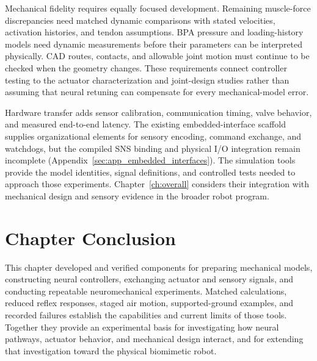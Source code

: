 Mechanical fidelity requires equally focused development. Remaining muscle-force discrepancies need matched dynamic comparisons with stated velocities, activation histories, and tendon assumptions. BPA pressure and loading-history models need dynamic measurements before their parameters can be interpreted physically. CAD routes, contacts, and allowable joint motion must continue to be checked when the geometry changes. These requirements connect controller testing to the actuator characterization and joint-design studies rather than assuming that neural retuning can compensate for every mechanical-model error.

Hardware transfer adds sensor calibration, communication timing, valve behavior, and measured end-to-end latency. The existing embedded-interface scaffold supplies organizational elements for sensory encoding, command exchange, and watchdogs, but the compiled SNS binding and physical I/O integration remain incomplete (Appendix~\ref{sec:app_embedded_interfaces}). The simulation tools provide the model identities, signal definitions, and controlled tests needed to approach those experiments. Chapter~\ref{ch:overall} considers their integration with mechanical design and sensory evidence in the broader robot program.

\section{Chapter Conclusion}

This chapter developed and verified components for preparing mechanical models, constructing neural controllers, exchanging actuator and sensory signals, and conducting repeatable neuromechanical experiments. Matched calculations, reduced reflex responses, staged air motion, supported-ground examples, and recorded failures establish the capabilities and current limits of those tools. Together they provide an experimental basis for investigating how neural pathways, actuator behavior, and mechanical design interact, and for extending that investigation toward the physical biomimetic robot.

